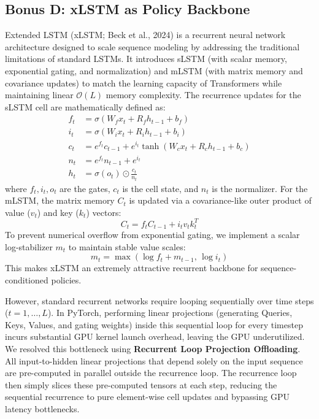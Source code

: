 \documentclass[11pt,a4paper]{article}
\begin{document}
\FloatBarrier

\subsection{Bonus D: xLSTM as Policy Backbone}
Extended LSTM (xLSTM; Beck et al., 2024) is a recurrent neural network architecture designed to scale sequence modeling by addressing the traditional limitations of standard LSTMs. It introduces sLSTM (with scalar memory, exponential gating, and normalization) and mLSTM (with matrix memory and covariance updates) to match the learning capacity of Transformers while maintaining linear $\mathcal{O}(L)$ memory complexity. The recurrence updates for the sLSTM cell are mathematically defined as:
\begin{equation}
\begin{aligned}
f_t &= \sigma(W_f x_t + R_f h_{t-1} + b_f) \\
i_t &= \sigma(W_i x_t + R_i h_{t-1} + b_i) \\
c_t &= e^{f_t} c_{t-1} + e^{i_t} \tanh(W_c x_t + R_c h_{t-1} + b_c) \\
n_t &= e^{f_t} n_{t-1} + e^{i_t} \\
h_t &= \sigma(o_t) \odot \frac{c_t}{n_t}
\end{aligned}
\end{equation}
where $f_t, i_t, o_t$ are the gates, $c_t$ is the cell state, and $n_t$ is the normalizer. For the mLSTM, the matrix memory $C_t$ is updated via a covariance-like outer product of value ($v_t$) and key ($k_t$) vectors:
\begin{equation}
C_t = f_t C_{t-1} + i_t v_t k_t^T
\end{equation}
To prevent numerical overflow from exponential gating, we implement a scalar log-stabilizer $m_t$ to maintain stable value scales:
\begin{equation}
m_t = \max\left(\log f_t + m_{t-1}, \, \log i_t\right)
\end{equation}
This makes xLSTM an extremely attractive recurrent backbone for sequence-conditioned policies.

However, standard recurrent networks require looping sequentially over time steps ($t = 1, \dots, L$). In PyTorch, performing linear projections (generating Queries, Keys, Values, and gating weights) inside this sequential loop for every timestep incurs substantial GPU kernel launch overhead, leaving the GPU underutilized. We resolved this bottleneck using \textbf{Recurrent Loop Projection Offloading}. All input-to-hidden linear projections that depend solely on the input sequence are pre-computed in parallel outside the recurrence loop. The recurrence loop then simply slices these pre-computed tensors at each step, reducing the sequential recurrence to pure element-wise cell updates and bypassing GPU latency bottlenecks.
\end{document}
